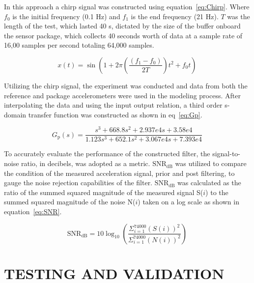\documentclass[]{spie}  %
\begin{document}
	In this approach a chirp signal was constructed using equation~\ref{eq:Chirp}. Where $f_0$ is the initial frequency (0.1 Hz) and $f_1$ is the end frequency (21 Hz). $T$ was the length of the test, which lasted 40 s, dictated by the size of the buffer onboard the sensor package, which collects 40 seconds worth of data at a sample rate of 16,00 samples per second totaling 64,000 samples.
	
	\begin{equation} 
		\label{eq:Chirp}
		x(t)=\sin(1 + 2\pi ( \frac{(f_1-f_0)}{2T} ) t^2 + f_0 t) \, 
	\end{equation}
	

	
	Utilizing the chirp signal, the experiment was conducted and data from both the reference and package accelerometers were used in the modeling process. After interpolating the data and using the input output relation, a third order s-domain transfer function was constructed as shown in eq~\ref{eq:Gp}. 
	
	\begin{equation}
		\label{eq:Gp}
		G_\text{p}(s) = \frac{s^3  + 668.8 s^2  + 2.937e4 s + 3.58e4}{1.123 s^3  + 652.1 s^2  + 3.067e4 s + 7.393e4} \, 
	\end{equation}

To accurately evaluate the performance of the constructed filter, the signal-to-noise ratio, in decibels, was adopted as a metric. $\text{SNR}_{\text{dB}}$ was utilized to compare the condition of the measured acceleration signal, prior and post filtering, to gauge the noise rejection capabilities of the filter. $\text{SNR}_{\text{dB}}$ was calculated as the ratio of the summed squared magnitude of the measured signal S($i$) to the summed squared magnitude of the noise N($i$) taken on a log scale as shown in equation~\ref{eq:SNR}.~\cite{Johnson2006}

	\begin{equation}
		\label{eq:SNR}
		\text{SNR}_{\text{dB}} =10 \log_{10}(\frac{\Sigma^{74000}_{i=1}(S(i))^2}{\Sigma^{74000}_{i=1}(N(i))^2}) \, 
	\end{equation}

	
	\section{TESTING AND VALIDATION}
	
\end{document}
